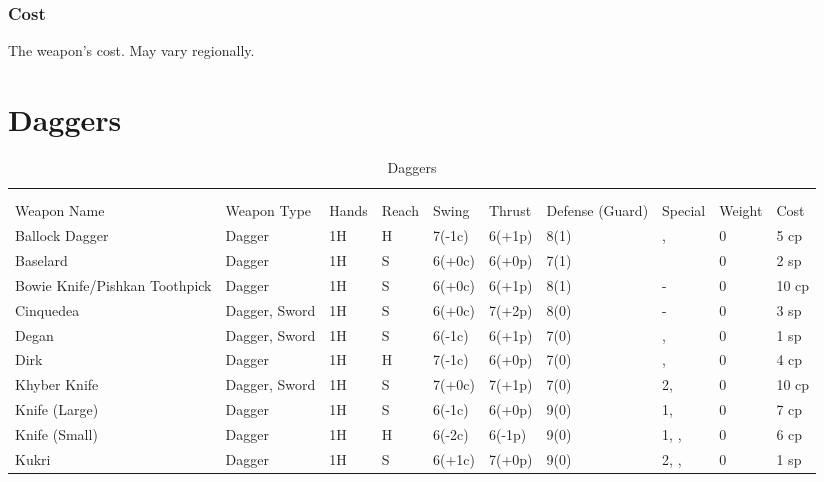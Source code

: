 \documentclass[oneside,11pt,english]{book}
\begin{document}
\subsubsection{Cost}
The weapon’s cost. May vary regionally.

\section{Daggers}\vspace{-15pt}
\begin{longtabu} to 1\linewidth {X[2,l]XX[-1,c]X[-1,c]XXX[-1,c]X[2,l]X[-3,c]X[-3,r]}
	\captionsetup{labelformat=blank,textformat=empty}
	\caption{Daggers}\vspace{-15pt}\\
	\label{tab:Daggers List}\\\endfirsthead
Weapon Name						&Weapon Type	&Hands&Reach&Swing&Thrust&Defense (Guard)&Special						&Weight	&Cost\\\toprule\endhead
Ballock Dagger					&Dagger			&1H	&H	&7(-1c)	&6(+1p)	&8(1)	&, 				&0	&5 cp\\
Baselard						&Dagger			&1H	&S	&6(+0c)	&6(+0p)	&7(1)	&							&0	&2 sp\\
Bowie Knife/Pishkan Toothpick	&Dagger			&1H	&S	&6(+0c)	&6(+1p)	&8(1)	&-										&0	&10 cp\\
Cinquedea						&Dagger, Sword	&1H	&S	&6(+0c)	&7(+2p)	&8(0)	&-										&0	&3 sp\\
Degan							&Dagger, Sword	&1H	&S	&6(-1c)	&6(+1p)	&7(0)	&, 				&0	&1 sp\\
Dirk							&Dagger			&1H	&H	&7(-1c)	&6(+0p)	&7(0)	&, 				&0	&4 cp\\
Khyber Knife					&Dagger, Sword	&1H	&S	&7(+0c)	&7(+1p)	&7(0)	& 2, 						&0	&10 cp\\
Knife (Large)					&Dagger			&1H	&S	&6(-1c)	&6(+0p)	&9(0)	& 1, 					&0	&7 cp\\
Knife (Small)					&Dagger			&1H	&H	&6(-2c)	&6(-1p)	&9(0)	& 1, , 		&0	&6 cp\\
Kukri							&Dagger			&1H	&S	&6(+1c)	&7(+0p)	&9(0)	& 2, , 		&0	&1 sp\\

\end{longtabu}
\end{document}
